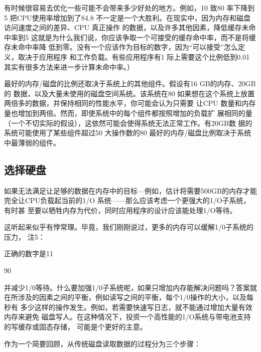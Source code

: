 有时候很容易去优化一些可能不会带来多少好处的地方。例如，10%
致80%
率下降到5%
把CPU使用率增加到了84.8%
不一定是一个大胜利。在现实中，因为内存和磁盘访问速度之间的差异、CPU 真正操作
的数据，以及许多其他因素，降低缓存未命中率到5%
这就是为什么我们说，你应该争取一个可接受的缓存命中率，而不是将缓存未命中率降
低到零。没有一个应该作为目标的数字，因为“可以接受”怎么定义，取决于应用程序
和工作负载。有些应用程序有1%
际上需要这个比例低到0.01%
其实有很多方法来进一步计算未命中率。）

最好的内存/磁盘的比例还取决于系统上的其他组件。假设有16 GB的内存、20GB的
数据，以及大量未使用的磁盘空间系统。该系统在80%
如果想在这个系统上放置两倍多的数据，并保持相同的性能水平，你可能会认为只需要
让CPU 数量和内存量也增加到两倍。然而，即使系统中的每个组件都按照增加的负载扩
展相同的量（一个不切实际的假设），这依然可能会使得系统无法正常工作。有20GB数
据的系统可能使用了某些组件超过50%
大操作数的80%
最好的内存/磁盘比例取决于系统中最薄弱的组件。

\subsection{选择硬盘}
如果无法满足让足够的数据在内存中的目标—例如，估计将需要500GB的内存才能
完全让CPU负载起当前的1/O 系统——那么应该考虑一个更强大的1/O子系统，有时甚
至要以牺牲内存为代价，同时应用程序的设计应该能处理1/O等待。

这听起来似乎有悖常理。毕竟，我们刚刚说过，更多的内存可以缓解1/0子系统的压力，
注5：

正确的数字是11%

90%

并减少1/0等待。什么要加强1/0子系统呢，如果只增加内存能解决问题吗？答案就
在所涉及的因素之间的平衡，例如读写之间的平衡，每个1/0操作的大小，以及每秒有
多少这样的操作发生。例如，若需要快速写日志，就不能通过增加大量有效内存来避免
磁盘写人。在这种情况下，投资一个高性能的1/O系统与带电池支持的写缓存或固态存储，
可能是个更好的主意。

作为一个简要回顾，从传统磁盘读取数据的过程分为三个步骤：

